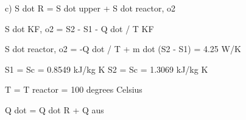 c) S dot R = S dot upper + S dot reactor, o2

S dot KF, o2 = S2 - S1 - Q dot / T KF

S dot reactor, o2 = -Q dot / T + m dot (S2 - S1) = 4.25 W/K

S1 = Sc = 0.8549 kJ/kg K
S2 = Sc = 1.3069 kJ/kg K

T = T reactor = 100 degrees Celsius

Q dot = Q dot R + Q aus